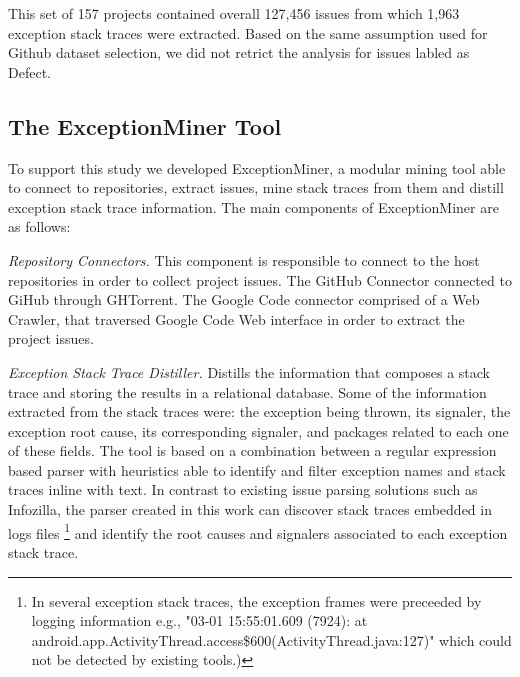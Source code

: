 \documentclass[conference]{IEEEtran}
\begin{document}
This set of 157 projects contained overall 127,456 issues from which 1,963 exception stack traces 
were extracted. Based on the same assumption used for Github dataset selection, we did not retrict 
the analysis for issues labled as Defect. 






\subsection{The ExceptionMiner Tool}
\label{sec:exceptionminer}

To support this study we developed ExceptionMiner, a modular mining tool able 
to connect to repositories, extract issues, mine stack traces from
them and distill exception stack trace information. The main components of
ExceptionMiner are as follows:

\noindent\emph{Repository Connectors.}  This component is responsible to connect to
 the host repositories in order to collect project issues. The GitHub Connector connected
 to GiHub through GHTorrent. The Google Code connector comprised of a Web Crawler,
 that traversed Google Code Web interface in order to extract the project issues.

\noindent\emph{Exception Stack Trace Distiller.} 
Distills the information that composes a stack trace and storing the results in a
relational database. Some of the information extracted from the stack traces were:
 the exception being thrown, its signaler, the exception root cause, its corresponding signaler,
and packages related to each one of these fields.
The tool is based on a combination between a regular expression based parser 
with heuristics able to identify and filter exception names and stack traces inline with text. In
contrast to existing issue parsing solutions such as Infozilla, the parser
created in this work can discover stack traces embedded in logs files \footnote{In several 
exception stack traces, the exception frames were preceeded by logging information e.g., "03-01 15:55:01.609 (7924): at android.app.ActivityThread.access\$600(ActivityThread.java:127)" which could not be detected by existing tools.)}  
and identify the root causes and signalers associated to each exception stack trace.
\end{document}
